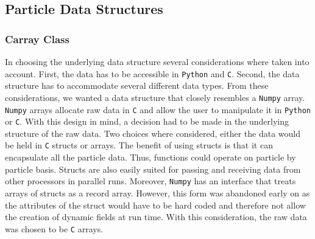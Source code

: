 \subsection{Particle Data Structures}
\subsubsection{Carray Class}
In choosing the underlying data structure several considerations where taken into account. First, the
data has to be accessible in \texttt{Python} and \texttt{C}. Second, the data structure has to
accommodate several different data types. From these considerations, we wanted a data structure
that closely resembles a \texttt{Numpy} array. \texttt{Numpy} arrays allocate raw data in \texttt{C} and 
allow the user to manipulate it in \texttt{Python} or \texttt{C}. With this design in mind, a
decision had to be made in the underlying structure of the raw data. Two choices where considered, 
either the data would be held in \texttt{C} structs or arrays. The benefit of using structs is that it
can encapsulate all the particle data. Thus, functions could operate on particle by particle basis.
Structs are also easily suited for passing and receiving data from other processors
in parallel runs. Moreover, \texttt{Numpy} has an interface that treats
arrays of structs as a record array. However, this form was abandoned early on
as the attributes of the struct would have to be hard coded and therefore not allow the creation of
dynamic fields at run time. With this consideration, the raw data was chosen to be
\texttt{C} arrays. 

